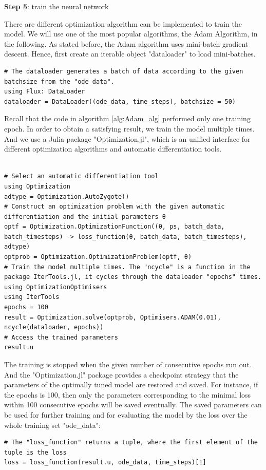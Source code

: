 \documentclass[
	parskip, 			   %
	twoside, 			   %
	DIV=14, 			   %
	BCOR=15.0mm, 		   %
	headsepline, 		   %
	open=right, 		   %
	captions=tableheading, %
	bibliography=totoc,    %
	numbers=noenddot       %
]{scrreprt}
\begin{document}
\textbf{Step 5}: train the neural network

There are different optimization algorithm can be implemented to train the model. We will use one of the most popular algorithms, the Adam Algorithm, in the following. As stated before, the Adam algorithm uses mini-batch gradient descent. Hence, first create an iterable object "dataloader" to load mini-batches.

\begin{verbatim}
# The dataloader generates a batch of data according to the given batchsize from the "ode_data".
using Flux: DataLoader
dataloader = DataLoader((ode_data, time_steps), batchsize = 50)
\end{verbatim}

Recall that the code in algorithm \ref{alg:Adam_alg} performed only one training epoch. In order to obtain a satisfying result, we train the model multiple times. And we use a Julia package "Optimization.jl", which is an unified interface for different optimization algorithms and automatic differentiation tools.

\begin{verbatim}

# Select an automatic differentiation tool
using Optimization
adtype = Optimization.AutoZygote()
# Construct an optimization problem with the given automatic differentiation and the initial parameters θ
optf = Optimization.OptimizationFunction((θ, ps, batch_data, batch_timesteps) -> loss_function(θ, batch_data, batch_timesteps), adtype)
optprob = Optimization.OptimizationProblem(optf, θ)
# Train the model multiple times. The "ncycle" is a function in the package IterTools.jl, it cycles through the dataloader "epochs" times.
using OptimizationOptimisers
using IterTools
epochs = 100
result = Optimization.solve(optprob, Optimisers.ADAM(0.01), ncycle(dataloader, epochs))
# Access the trained parameters
result.u
\end{verbatim}

The training is stopped when the given number of consecutive epochs run out. And the "Optimization.jl" package provides a checkpoint strategy that the parameters of the optimally tuned model are restored and saved. For instance, if the epochs is 100, then only the parameters corresponding to the minimal loss within 100 consecutive epochs will be saved eventually.  The saved parameters can be used for further training and for evaluating the model by the loss over the whole training set "ode\_data":
\begin{verbatim}
# The "loss_function" returns a tuple, where the first element of the tuple is the loss
loss = loss_function(result.u, ode_data, time_steps)[1]
\end{verbatim}
\end{document}

